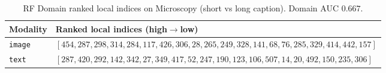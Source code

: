 \begin{table}[ht]
\centering
\caption{RF Domain ranked local indices on Microscopy (short vs long caption). Domain AUC $0.667$.}
\label{tab:mm-fsds-microscopy_clip-rf}
\small
\begin{tabular}{@{}l p{11.2cm}@{}}
\toprule
Modality & Ranked local indices (high$\to$low) \\
\midrule
\texttt{image} & $[454,287,298,314,284,117,426,306,28,265,249,328,141,68,76,285,329,414,442,157]$ \\
\texttt{text} & $[287,420,292,142,342,27,349,417,52,247,190,123,106,507,14,20,492,150,235,306]$ \\
\bottomrule
\end{tabular}
\end{table}

